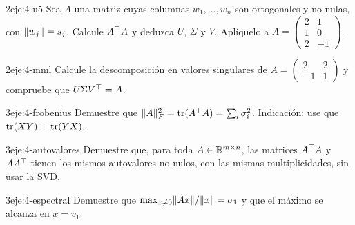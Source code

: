 \begin{ejercicio}{2}{eje:4-u5}
Sea $A$ una matriz cuyas columnas $w_1,\dots,w_n$ son ortogonales y no nulas, con $\lVert w_j\rVert=s_j$. Calcule $A^{\top} A$ y deduzca $U$, $\Sigma$ y $V$. Aplíquelo a $A=\begin{pmatrix}2&1\\1&0\\2&-1\end{pmatrix}$.
\end{ejercicio}

\begin{ejercicio}{2}{eje:4-mml}
Calcule la descomposición en valores singulares de $A=\begin{pmatrix}2&2\\-1&1\end{pmatrix}$ y compruebe que $U\Sigma V^{\top}=A$.
\end{ejercicio}

\begin{ejercicio}{3}{eje:4-frobenius}
Demuestre que $\lVert A\rVert_F^{2}=\operatorname{tr}(A^{\top} A)=\sum_i\sigma_i^{2}$. Indicación: use que $\operatorname{tr}(XY)=\operatorname{tr}(YX)$.
\end{ejercicio}

\begin{ejercicio}{3}{eje:4-autovalores}
Demuestre que, para toda $A\in\mathbb{R}^{m\times n}$, las matrices $A^{\top} A$ y $AA^{\top}$ tienen los mismos autovalores no nulos, con las mismas multiplicidades, sin usar la SVD.
\end{ejercicio}

\begin{ejercicio}{3}{eje:4-espectral}
Demuestre que $\max_{x\ne 0}\lVert Ax\rVert/\lVert x\rVert=\sigma_1$ y que el máximo se alcanza en $x=v_1$.
\end{ejercicio}
